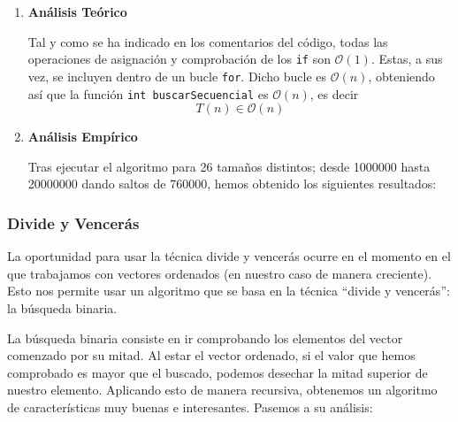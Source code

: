 \documentclass[10pt,a4paper]{article}
\begin{document}
\begin{enumerate}
	\item \textbf{Análisis Teórico}
	
	
	
	Tal y como se ha indicado en los comentarios del código, todas las operaciones de asignación y comprobación de los \texttt{if} son \(\mathcal{O}(1)\). Estas, a sus vez, se incluyen dentro de un bucle \texttt{for}. Dicho bucle es \(\mathcal{O}(n)\), obteniendo así que la función \texttt{int buscarSecuencial} es \(\mathcal{O}(n)\), es decir
	\[
	T(n) \in \mathcal{O}(n)
	\]
	
	\item \textbf{Análisis Empírico}
	
	Tras ejecutar el algoritmo para 26 tamaños distintos; desde 1000000 hasta 20000000 dando saltos de 760000, hemos obtenido los siguientes resultados:
	
	\begin{table}[h!]
	\centering
	\footnotesize
	\caption{Experiencia empírica de algoritmo de Inserción sin optimizar}
\end{table}
\end{enumerate}

\subsubsection{Divide y Vencerás}
La oportunidad para usar la técnica divide y vencerás ocurre en el momento en el que trabajamos con vectores ordenados (en nuestro caso de manera creciente). Esto nos permite usar un algoritmo que se basa en la técnica ``divide y vencerás'': la búsqueda binaria.

La búsqueda binaria consiste en ir comprobando los elementos del vector comenzado por su mitad. Al estar el vector ordenado, si el valor que hemos comprobado es mayor que el buscado, podemos desechar la mitad superior de nuestro elemento. Aplicando esto de manera recursiva, obtenemos un algoritmo de características muy buenas e interesantes. Pasemos a su análisis:
\end{document}
